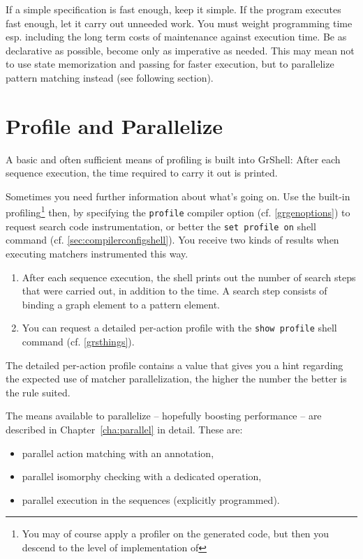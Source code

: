\pagebreak

\begin{note}
If a simple specification is fast enough, keep it simple.
If the program executes fast enough, let it carry out unneeded work.
You must weight programming time esp. including the long term costs of maintenance against execution time.
Be as declarative as possible, become only as imperative as needed.
This may mean not to use state memorization and passing for faster execution, but to parallelize pattern matching instead (see following section).
\end{note}


\section{Profile and Parallelize}\label{sec:performanceparallel}

A basic and often sufficient means of profiling is built into GrShell:
After each sequence execution, the time required to carry it out is printed.

Sometimes you need further information about what's going on.
Use the built-in profiling\footnote{You may of course apply a profiler on the generated code, but then you descend to the level of implementation of \GrG} then, by specifying the \texttt{profile} compiler option (cf. \ref{grgenoptions}) to request search code instrumentation, or better the \texttt{set profile on} shell command (cf. \ref{sec:compilerconfigshell}).
You receive two kinds of results when executing matchers instrumented this way.

\begin{enumerate}
	\item After each sequence execution, the shell prints out the number of search steps that were carried out, in addition to the time. 
		A search step consists of binding a graph element to a pattern element.
	\item You can request a detailed per-action profile with the \texttt{show profile} shell command (cf. \ref{grsthings}).
\end{enumerate}

The detailed per-action profile contains a value that gives you a hint regarding the expected use of matcher parallelization, the higher the number the better is the rule suited.

The means available to parallelize -- hopefully boosting performance -- are described in Chapter~\ref{cha:parallel} in detail.
These are:
\begin{itemize}
	\item parallel action matching with an annotation,
	\item parallel isomorphy checking with a dedicated operation,
	\item parallel execution in the sequences (explicitly programmed).
\end{itemize}

